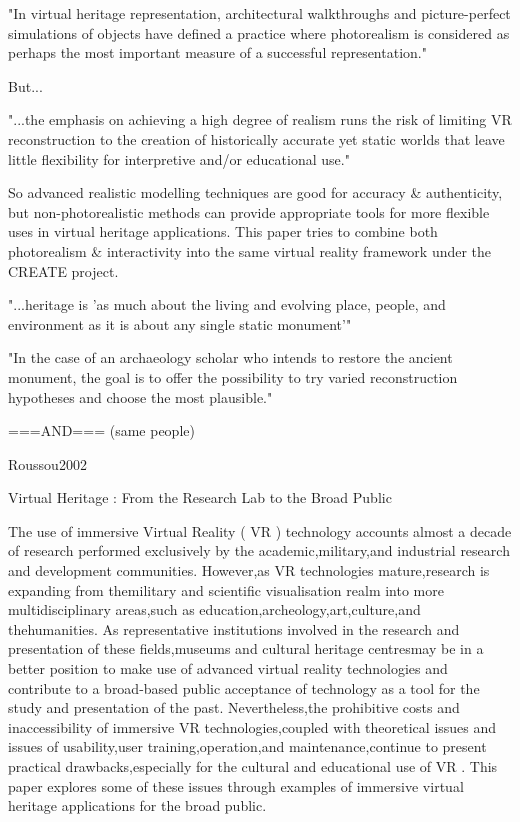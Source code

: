"In virtual heritage representation, architectural walkthroughs and picture-perfect simulations of objects
have defined a practice where photorealism is considered as perhaps the most important measure of a
successful representation."
        
But...
        
"...the emphasis on achieving a high degree of realism runs the risk of limiting VR reconstruction to the
creation of historically accurate yet static worlds that leave little flexibility for interpretive and/or
educational use."
        
So advanced realistic modelling techniques are good for accuracy \& authenticity, but non-photorealistic methods
can provide appropriate tools for more flexible uses in virtual heritage applications. This paper tries to
combine both photorealism \& interactivity into the same virtual reality framework under the CREATE project.
        
"...heritage is 'as much about the living and evolving place, people, and environment as it is about any
single static monument'"
        
"In the case of an archaeology scholar who intends to restore the ancient monument, the goal is to offer
the possibility to try varied reconstruction hypotheses and choose the most plausible."

===AND=== (same people)

Roussou2002

Virtual Heritage : From the Research Lab to the Broad Public

The use of immersive Virtual Reality (
VR
) technology accounts almost a decade of research performed exclusively by the academic,military,and industrial research and development communities. However,as
VR
technologies mature,research is expanding from themilitary and scientific visualisation realm into more multidisciplinary areas,such as education,archeology,art,culture,and thehumanities. As representative institutions involved in the research and presentation of these fields,museums and cultural heritage centresmay be in a better position to make use of advanced virtual reality technologies and contribute to a broad-based public acceptance of technology as a tool for the study and presentation of the past. Nevertheless,the prohibitive costs and inaccessibility of immersive
VR
technologies,coupled with theoretical issues and issues of usability,user training,operation,and maintenance,continue to present  practical drawbacks,especially for the cultural and educational use of 
VR
. This paper explores some of these issues through examples of immersive virtual heritage applications for the broad public.


